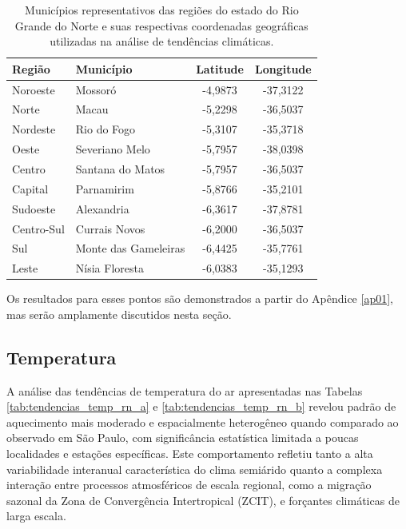 \begin{table}[htbp]
	\centering
	\caption[Municípios representativos das regiões do estado do Rio Grande do Norte]{Municípios representativos das regiões do estado do Rio Grande do Norte e suas respectivas coordenadas geográficas utilizadas na análise de tendências climáticas.}
	\label{tab:coordenadas_rn}
	\begin{tabular}{llcc}
		\hline
		\textbf{Região} & \textbf{Município} & \textbf{Latitude} & \textbf{Longitude} \\
		\hline
           Noroeste & Mossoró & -4{,}9873 & -37{,}3122\\
           Norte & Macau  & -5{,}2298 & -36{,}5037\\
           Nordeste & Rio do Fogo & -5{,}3107 & -35{,}3718\\
           Oeste & Severiano Melo & -5{,}7957 & -38{,}0398\\
           Centro & Santana do Matos & -5{,}7957 & -36{,}5037\\
           Capital & Parnamirim & -5{,}8766 & -35{,}2101\\
           Sudoeste & Alexandria & -6{,}3617 & -37{,}8781\\
           Centro-Sul & Currais Novos & -6{,}2000 & -36{,}5037\\
           Sul & Monte das Gameleiras& -6{,}4425 & -35{,}7761\\
          Leste & Nísia Floresta & -6{,}0383 & -35{,}1293\\
		\hline
	\end{tabular}
\end{table}

Os resultados para esses pontos são demonstrados a partir do Apêndice \ref{ap01}, mas serão amplamente discutidos nesta seção.

\subsection{Temperatura}

A análise das tendências de temperatura do ar apresentadas nas Tabelas \ref{tab:tendencias_temp_rn_a} e \ref{tab:tendencias_temp_rn_b} revelou padrão de aquecimento mais moderado e espacialmente heterogêneo quando comparado ao observado em São Paulo, com significância estatística limitada a poucas localidades e estações específicas. Este comportamento refletiu tanto a alta variabilidade interanual característica do clima semiárido quanto a complexa interação entre processos atmosféricos de escala regional, como a migração sazonal da Zona de Convergência Intertropical (ZCIT), e forçantes climáticas de larga escala.

